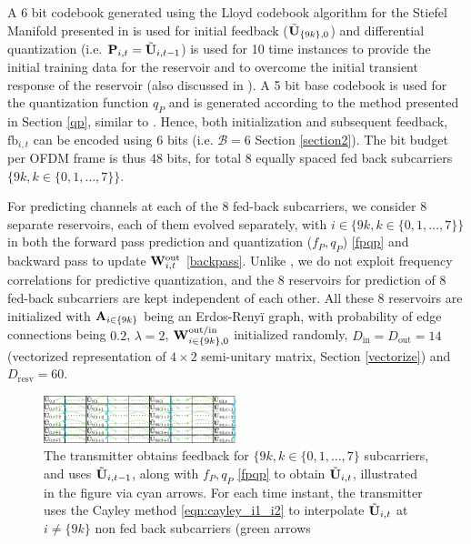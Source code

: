 \documentclass[conference]{IEEEtran}
\begin{document}
{A 6 bit codebook generated using the Lloyd codebook algorithm for the Stiefel Manifold presented in \cite{6678348} is used for initial feedback ($\tilde{{\bf U}}_{\{9k\},0}$) and differential quantization (i.e. ${\bf P}_{i,t}=\tilde{{\bf U}}_{i,t-1}$) is used for 10 time instances to provide the initial training data for the reservoir and to overcome the initial transient response of the reservoir (also discussed in \cite{mosleh2017brain}).
A 5 bit base codebook is used for the quantization function $q_P$ and is generated according to the method presented in Section \ref{qp}, similar to \cite{Gupt1905:Predictive}.
Hence, both initialization and subsequent feedback, $\text{fb}_{i,t}$ can be encoded using 6 bits (i.e. $\mathcal{B}=6$ Section \ref{section2}).
The bit budget per OFDM frame is thus 48 bits, for total 8 equally spaced fed back subcarriers $\{9k, k \in \{0,1,\ldots,7\}\}$.

For predicting channels at each of the $8$ fed-back subcarriers, we consider $8$ separate reservoirs, each of them evolved separately, with $i\in\{9k, k \in \{0,1,\ldots,7\}\}$ in both the forward pass prediction and quantization ($f_P,q_P$) \eqref{fpqp} and backward pass to update ${\bf W}_{i,t}^{\text{out}}$ \eqref{backpass}. Unlike \cite{Gupt1905:Predictive}, we do not exploit frequency correlations for predictive quantization, and the $8$ reservoirs for prediction of $8$ fed-back subcarriers are kept independent of each other.
All these 8 reservoirs are initialized with ${\bf A}_{i\in\{9k\}}$ being an Erdos-Reny\"i graph, with probability of edge connections being $0.2$, $\lambda=2$, ${\bf W}^{\text{out/in}}_{i\in\{9k\},0}$ initialized randomly, $D_{\text{in}}=D_{\text{out}}=14$ (vectorized representation of $4\times2$ semi-unitary matrix, Section \ref{vectorize}) and $D_{\text{resv}}=60$.
\begin{figure}
\centering
\includegraphics[width=0.5\textwidth]{images/table.pdf}
\caption{The transmitter obtains feedback for $\{9k, k \in \{0,1,\ldots,7\}$ subcarriers, and uses $\tilde{{\bf U}}_{i,t-1}$, along with $f_P,q_P$ \eqref{fpqp} to obtain $\tilde{{\bf U}}_{i,t}$, illustrated in the figure via cyan arrows. For each time instant, the transmitter uses the Cayley method  \eqref{eqn:cayley_i1_i2} to interpolate $\tilde{{\bf U}}_{i,t}$ at $i\neq\{9k\}$ non fed back subcarriers (green arrows}
\label{table}
\vspace{5pt}
\end{figure}

}
\end{document}
